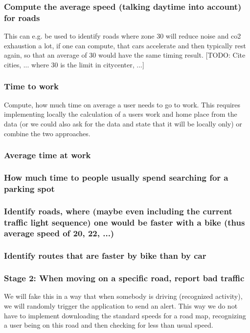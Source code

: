 \subsubsection{Compute the average speed (talking daytime into account) for roads}
This can e.g. be used to identify roads where zone 30 will reduce noise and co2 exhaustion a lot, if one can compute, that cars accelerate and then typically rest again, so that an average of 30 would have the same timing result. [TODO: Cite cities, ... where 30 is the limit in citycenter, ...]
\subsubsection{Time to work}
Compute, how much time on average a user needs to go to work.
This requires implementing locally the calculation of a users work and home place from the data (or we could also ask for the data and state that it will be locally only) or combine the two approaches.
\subsubsection{Average time at work}
\subsubsection{How much time to people usually spend searching for a parking spot}
\subsubsection{Identify roads, where (maybe even including the current traffic light sequence) one would be faster with a bike (thus average speed of 20, 22, ...)}
\subsubsection{Identify routes that are faster by bike than by car}



\subsubsection{Stage 2: When moving on a specific road, report bad traffic}
We will fake this in a way that when somebody is driving (recognized activity), we will randomly trigger the application to send an alert.
This way we do not have to implement downloading the standard speeds for a road map, recognizing a user being on this road and then checking for less than usual speed.